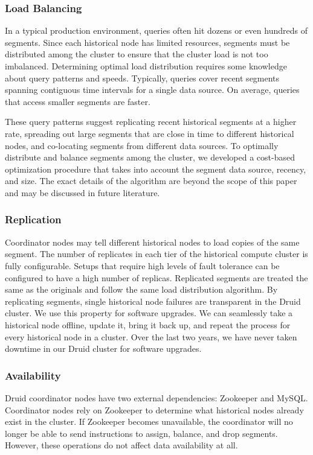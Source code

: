 \documentclass{sig-alternate-2013}
\begin{document}
\subsubsection{Load Balancing}
In a typical production environment, queries often hit dozens or even hundreds
of segments. Since each historical node has limited resources, segments must be
distributed among the cluster to ensure that the cluster load is not too
imbalanced. Determining optimal load distribution requires some knowledge about
query patterns and speeds. Typically, queries cover recent segments spanning
contiguous time intervals for a single data source.  On average, queries that
access smaller segments are faster.

These query patterns suggest replicating recent historical segments at a higher
rate, spreading out large segments that are close in time to different
historical nodes, and co-locating segments from different data sources.  To
optimally distribute and balance segments among the cluster, we developed a
cost-based optimization procedure that takes into account the segment data
source, recency, and size. The exact details of the algorithm are beyond the
scope of this paper and may be discussed in future literature.

\subsubsection{Replication}
Coordinator nodes may tell different historical nodes to load copies of the
same segment. The number of replicates in each tier of the historical compute
cluster is fully configurable. Setups that require high levels of fault
tolerance can be configured to have a high number of replicas. Replicated
segments are treated the same as the originals and follow the same load
distribution algorithm. By replicating segments, single historical node
failures are transparent in the Druid cluster. We use this property for
software upgrades. We can seamlessly take a historical node offline, update it,
bring it back up, and repeat the process for every historical node in a
cluster. Over the last two years, we have never taken downtime in our Druid
cluster for software upgrades.

\subsubsection{Availability}
Druid coordinator nodes have two external dependencies: Zookeeper and MySQL.
Coordinator nodes rely on Zookeeper to determine what historical nodes already
exist in the cluster. If Zookeeper becomes unavailable, the coordinator will no
longer be able to send instructions to assign, balance, and drop segments.
However, these operations do not affect data availability at all.
\end{document}
